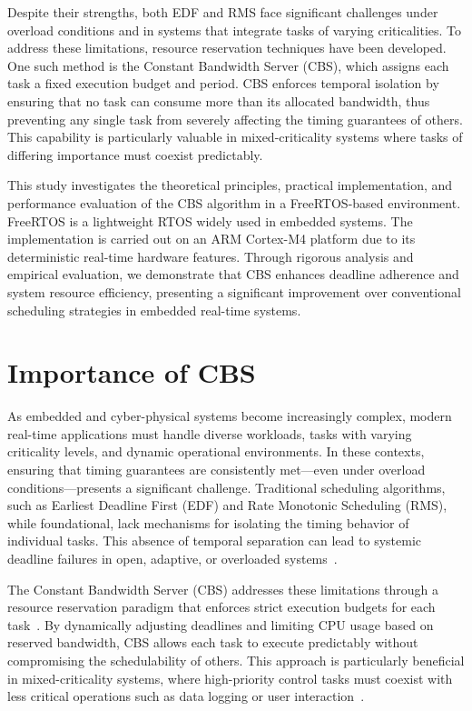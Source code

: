 \documentclass[conference]{IEEEtran}
\begin{document}
Despite their strengths, both EDF and RMS face significant challenges under overload conditions and in systems that integrate tasks of varying criticalities. To address these limitations, resource reservation techniques have been developed. One such method is the Constant Bandwidth Server (CBS), which assigns each task a fixed execution budget and period. CBS enforces temporal isolation by ensuring that no task can consume more than its allocated bandwidth, thus preventing any single task from severely affecting the timing guarantees of others. This capability is particularly valuable in mixed-criticality systems where tasks of differing importance must coexist predictably.

This study investigates the theoretical principles, practical implementation, and performance evaluation of the CBS algorithm in a FreeRTOS-based environment. FreeRTOS is a lightweight RTOS widely used in embedded systems. The implementation is carried out on an ARM Cortex-M4 platform due to its deterministic real-time hardware features. Through rigorous analysis and empirical evaluation, we demonstrate that CBS enhances deadline adherence and system resource efficiency, presenting a significant improvement over conventional scheduling strategies in embedded real-time systems.

\section{\textbf{Importance of CBS} }

As embedded and cyber-physical systems become increasingly complex, modern real-time applications must handle diverse workloads, tasks with varying criticality levels, and dynamic operational environments. In these contexts, ensuring that timing guarantees are consistently met—even under overload conditions—presents a significant challenge. Traditional scheduling algorithms, such as Earliest Deadline First (EDF) and Rate Monotonic Scheduling (RMS), while foundational, lack mechanisms for isolating the timing behavior of individual tasks. This absence of temporal separation can lead to systemic deadline failures in open, adaptive, or overloaded systems~\cite{liu1973scheduling}.

The Constant Bandwidth Server (CBS) addresses these limitations through a resource reservation paradigm that enforces strict execution budgets for each task~\cite{abeni1998integrating}. By dynamically adjusting deadlines and limiting CPU usage based on reserved bandwidth, CBS allows each task to execute predictably without compromising the schedulability of others. This approach is particularly beneficial in mixed-criticality systems, where high-priority control tasks must coexist with less critical operations such as data logging or user interaction~\cite{baruah2004dynamic}.
\end{document}
